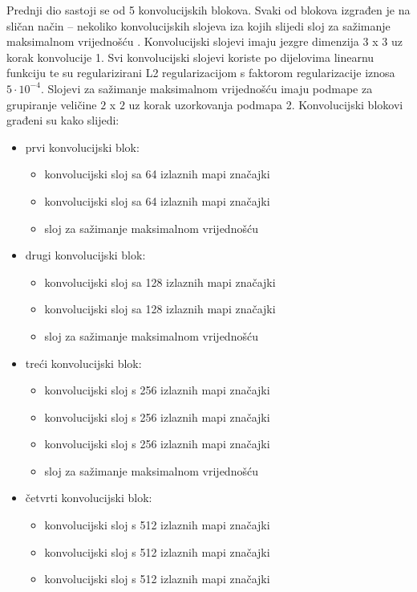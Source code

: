 \documentclass[times, utf8, diplomski, numeric]{fer}
\begin{document}
Prednji dio sastoji se od 5 konvolucijskih blokova. 
Svaki od blokova izgrađen je na sličan način -- nekoliko konvolucijskih slojeva iza kojih slijedi sloj za sažimanje maksimalnom vrijednošću .
Konvolucijski slojevi imaju jezgre dimenzija $3$ x $3$ uz korak konvolucije  1. 
Svi konvolucijski slojevi koriste po dijelovima linearnu funkciju  te su regularizirani L2 regularizacijom s faktorom regularizacije iznosa $5\cdot10^{-4}$.
Slojevi za sažimanje maksimalnom vrijednošću imaju podmape za grupiranje veličine $2$ x $2$ uz korak uzorkovanja podmapa 2.
Konvolucijski blokovi građeni su kako slijedi:
\begin{itemize}
 \item prvi konvolucijski blok:
 \begin{itemize}
  \item konvolucijski sloj sa 64 izlaznih mapi značajki
  \item konvolucijski sloj sa 64 izlaznih mapi značajki
  \item sloj za sažimanje maksimalnom vrijednošću
 \end{itemize}
  \item drugi konvolucijski blok:
 \begin{itemize}
  \item konvolucijski sloj sa 128 izlaznih mapi značajki
  \item konvolucijski sloj sa 128 izlaznih mapi značajki
  \item sloj za sažimanje maksimalnom vrijednošću
 \end{itemize}
   \item treći konvolucijski blok:
 \begin{itemize}
  \item konvolucijski sloj s 256 izlaznih mapi značajki
  \item konvolucijski sloj s 256 izlaznih mapi značajki
  \item konvolucijski sloj s 256 izlaznih mapi značajki
  \item sloj za sažimanje maksimalnom vrijednošću
 \end{itemize}
    \item četvrti konvolucijski blok:
 \begin{itemize}
  \item konvolucijski sloj s 512 izlaznih mapi značajki
  \item konvolucijski sloj s 512 izlaznih mapi značajki
  \item konvolucijski sloj s 512 izlaznih mapi značajki

\end{itemize}
\end{itemize}
\end{document}
